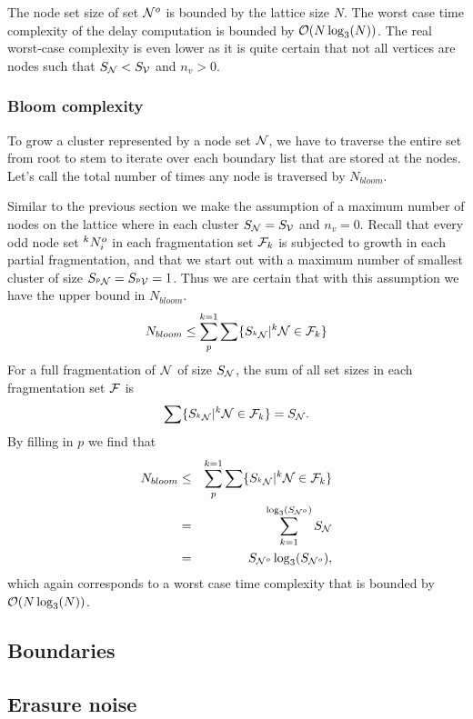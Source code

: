 The node set size of set $\mathcal{N}^o$ is bounded by the lattice size $N$. The worst case time complexity of the delay computation is bounded by $\mathcal{O}(N\log_3(N))$. The real worst-case complexity is even lower as it is quite certain that not all vertices are nodes such that $S_{\mathcal{N}} < S_{\mathcal{V}}$ and $n_v > 0$.

\subsubsection{Bloom complexity}

To grow a cluster represented by a node set $\mathcal{N}$, we have to traverse the entire set from root to stem to iterate over each boundary list that are stored at the nodes. Let's call the total number of times any node is traversed by  $N_{bloom}$.

Similar to the previous section we make the assumption of a maximum number of nodes on the lattice where in each cluster $S_{\mathcal{N}} = S_{\mathcal{V}}$ and $n_v = 0$. Recall that every odd node set ${}^{k}N^o_i$ in each fragmentation set $\mathcal{F}_k$ is subjected to growth in each partial fragmentation, and that we start out with a maximum number of smallest cluster of size $S_{{}^{p}\mathcal{N}} = S_{{}^{p}\mathcal{V}} = 1$. Thus we are certain that with this assumption we have the upper bound in $N_{bloom}$.
\begin{equation}\label{eq:nnode}
  N_{bloom} \leq \sum_{p}^{k=1}\sum \{ S_{{}^{k}\mathcal{N}} | {}^{k}\mathcal{N} \in \mathcal{F}_k \}
\end{equation}
For a full fragmentation of $\mathcal{N}$ of size $S_{\mathcal{N}}$, the sum of all set sizes in each fragmentation set $\mathcal{F}$ is
\begin{equation}\label{eq:sumsetsfrag}
  \sum \{S_{{}^{k}\mathcal{N}} | {}^{k}\mathcal{N} \in \mathcal{F}_k \} = S_{\mathcal{N}}.
\end{equation}
By filling in $p$ we find that
\begin{eqnarray}
  \nonumber N_{bloom} &\leq& \sum_{p}^{k=1}\sum \{ S_{{}^{k}\mathcal{N}} | {}^{k}\mathcal{N} \in \mathcal{F}_k \} \\
  \nonumber &=& \sum_{k=1}^{\log_3(S_{\mathcal{N}^o})} S_{\mathcal{N}} \\
   &=& S_{\mathcal{N}^o}\log_3(S_{\mathcal{N}^o}),
\end{eqnarray}
which again corresponds to a worst case time complexity that is bounded by $\mathcal{O}(N\log_3(N))$.

\subsection{Boundaries}

\subsection{Erasure noise} 